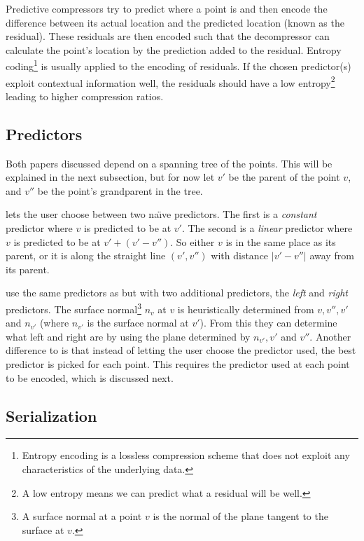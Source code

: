 \documentclass{report}
\begin{document}
Predictive compressors try to predict where a point is and then encode the
difference between its actual location and the predicted location (known as
the residual). These residuals are then encoded such that the decompressor can
calculate the point's location by the prediction added to the
residual. Entropy coding\footnote{Entropy encoding is a lossless compression
  scheme that does not exploit any characteristics of the underlying data.} is
usually applied to the encoding of residuals. If the chosen predictor(s)
exploit contextual information well, the residuals should have a low
entropy\footnote{A low entropy means we can predict what a residual will be
  well.}  leading to higher compression ratios.


\subsection{Predictors}

Both papers discussed depend on a spanning tree of the points. This will be
explained in the next subsection, but for now let $v'$ be the parent of the
point $v$, and $v''$ be the point's grandparent in the tree.

\citet{gumholdcomp} lets the user choose between two na\"{\i}ve
predictors. The first is a \emph{constant} predictor where $v$ is predicted to
be at $v'$. The second is a \emph{linear} predictor where $v$ is predicted to
be at $v' + (v' - v'')$. So either $v$ is in the same place as its parent, or
it is along the straight line $(v', v'')$ with distance $|v'-v''|$ away from
its parent.

\citet{merrycomp} use the same predictors as \citeauthor{gumholdcomp} but with
two additional predictors, the \emph{left} and \emph{right} predictors. The
surface normal\footnote{A surface normal at a point $v$ is the normal of the
  plane tangent to the surface at $v$.} $n_v$ at $v$ is heuristically
determined from $v, v'', v'$ and $n_{v'}$ (where $n_{v'}$ is the surface
normal at $v'$). From this they can determine what left and right are by using
the plane determined by $n_{v'}, v'$ and $v''$. Another difference to
\citeauthor{gumholdcomp} is that instead of letting the user choose the
predictor used, the best predictor is picked for each point. This requires the
predictor used at each point to be encoded, which is discussed next.


\subsection{Serialization}
\end{document}
